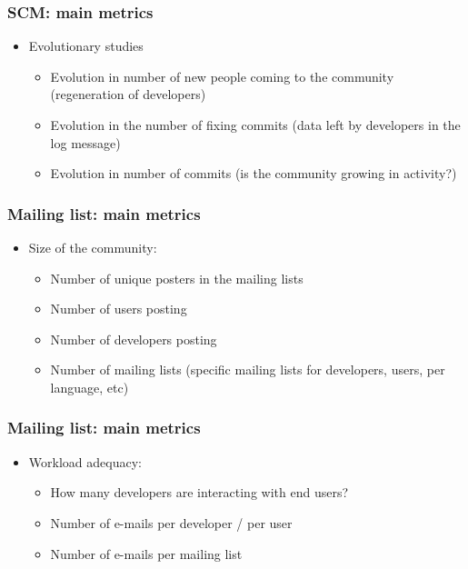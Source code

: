 \documentclass{beamer}
\begin{document}
\begin{frame}
 \frametitle{SCM: main metrics}
 \begin{itemize}
 \item Evolutionary studies
  \begin{itemize}
  \item Evolution in number of new people coming to the community (regeneration of developers)
  \item Evolution in the number of fixing commits (data left by developers in the log message)
  \item Evolution in number of commits (is the community growing in activity?)
  \end{itemize}
 \end{itemize}


\end{frame}



\begin{frame}
 \frametitle{Mailing list: main metrics}
 \begin{itemize}
  \item Size of the community:
    \begin{itemize}
     \item Number of unique posters in the mailing lists
     \item Number of users posting
     \item Number of developers posting
     \item Number of mailing lists (specific mailing lists for developers, users, per language, etc)
    \end{itemize}
 \end{itemize}
\end{frame}



\begin{frame}
 \frametitle{Mailing list: main metrics}
 \begin{itemize}
  \item Workload adequacy: 
  \begin{itemize}
    \item How many developers are interacting with end users?
    \item Number of e-mails per developer / per user
    \item Number of e-mails per mailing list
  \end{itemize}

 \end{itemize}

\end{frame}
\end{document}
